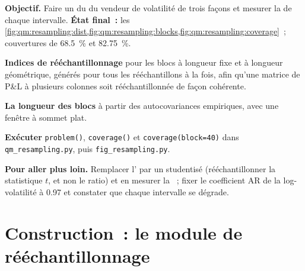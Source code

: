 \begin{tutorial}
\textbf{Objectif.} Faire un  du  du vendeur de volatilité de trois façons et mesurer la  de chaque intervalle.
\textbf{État final~:} les \cref{fig:qm:resampling:dist,fig:qm:resampling:blocks,fig:qm:resampling:coverage}~; couvertures de 68.5~\% et 82.75~\%.
\begin{tutsteps}
\item \textbf{Indices de rééchantillonnage} pour les blocs à longueur fixe et à longueur géométrique, générés pour tous les rééchantillons à la fois, afin qu'une matrice de P\&L à plusieurs colonnes
soit rééchantillonnée de façon cohérente.
\label{lst:qm:resampling:indices}
\item \textbf{La longueur des blocs} à partir des autocovariances empiriques, avec une fenêtre à sommet plat.
\label{lst:qm:resampling:block}
\item \textbf{Exécuter} \texttt{problem()}, \texttt{coverage()} et \texttt{coverage(block=40)} dans \texttt{qm\_resampling.py}, puis
\texttt{fig\_resampling.py}.
\end{tutsteps}
\textbf{Pour aller plus loin.} Remplacer l' par un  studentisé (rééchantillonner la statistique $t$, et non le ratio) et
en mesurer la ~; fixer le coefficient AR de la log-volatilité à 0.97 et constater que chaque intervalle se dégrade.
\end{tutorial}

\section{Construction~: le module de rééchantillonnage}\label{bld:qm:resampling:resample}

